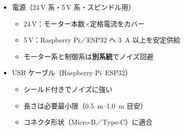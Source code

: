 \documentclass[uplatex,dvipdfmx]{ujarticle}
\begin{document}
\begin{itemize}
\begin{itemize}
      \item \SIrange{200}{400}{\watt} 以上を目安
    \end{itemize}
  \item 電源（24\,V 系・5\,V 系・スピンドル用）
    \begin{itemize}
      \item 24\,V：モーター本数×定格電流をカバー
      \item 5\,V：Raspberry Pi／ESP32 へ \SI{3}{\ampere} 以上を安定供給
      \item モーター系と制御系は\textbf{別系統}でノイズ回避
    \end{itemize}
  \item USB ケーブル（Raspberry Pi--ESP32）
    \begin{itemize}
      \item シールド付きでノイズに強い
      \item 長さは必要最小限（\SIrange{0.5}{1.0}{\meter} 目安）
      \item コネクタ形状（Micro-B／Type-C）に適合
    \end{itemize}
\end{itemize}
\end{document}
